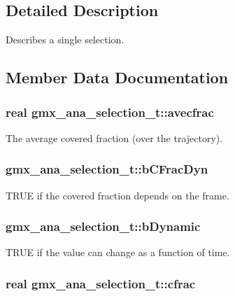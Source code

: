 \subsection{\-Detailed \-Description}
\-Describes a single selection. 

\subsection{\-Member \-Data \-Documentation}
\hypertarget{structgmx__ana__selection__t_a4145e1e222e45997d9e5d2e6c451e606}{
\subsubsection[{avecfrac}]{\setlength{\rightskip}{0pt plus 5cm}real {\bf gmx\-\_\-ana\-\_\-selection\-\_\-t\-::avecfrac}}}\label{structgmx__ana__selection__t_a4145e1e222e45997d9e5d2e6c451e606}
\-The average covered fraction (over the trajectory). \hypertarget{structgmx__ana__selection__t_aa247904e9b522f1effaaf11e7a95f0c8}{
\subsubsection[{b\-C\-Frac\-Dyn}]{ {\bf gmx\-\_\-ana\-\_\-selection\-\_\-t\-::b\-C\-Frac\-Dyn}}}\label{structgmx__ana__selection__t_aa247904e9b522f1effaaf11e7a95f0c8}
\-T\-R\-U\-E if the covered fraction depends on the frame. \hypertarget{structgmx__ana__selection__t_a47ef4b94fe3d429e271b9adcbe57f08f}{
\subsubsection[{b\-Dynamic}]{ {\bf gmx\-\_\-ana\-\_\-selection\-\_\-t\-::b\-Dynamic}}}\label{structgmx__ana__selection__t_a47ef4b94fe3d429e271b9adcbe57f08f}
\-T\-R\-U\-E if the value can change as a function of time. \hypertarget{structgmx__ana__selection__t_a84b162a293c1e7b32636e972bc7e4a95}{
\subsubsection[{cfrac}]{\setlength{\rightskip}{0pt plus 5cm}real {\bf gmx\-\_\-ana\-\_\-selection\-\_\-t\-::cfrac}}}\label{structgmx__ana__selection__t_a84b162a293c1e7b32636e972bc7e4a95}
